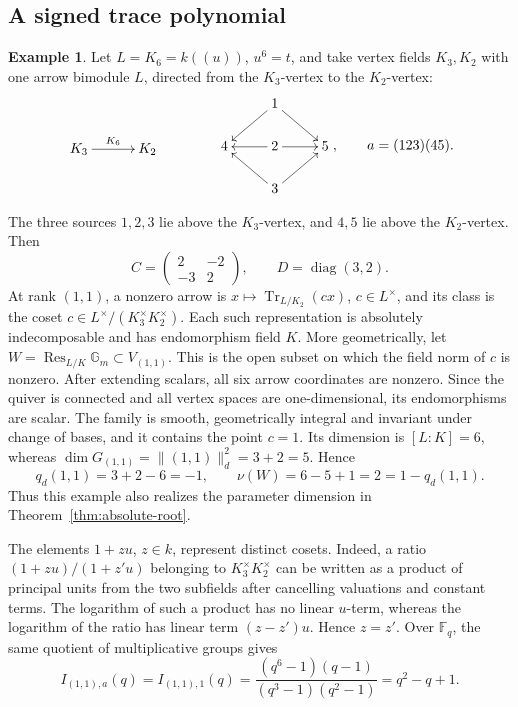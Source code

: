 \documentclass[11pt, reqno]{amsart}
\numberwithin{equation}{section}
\theoremstyle{definition}
\newtheorem{example}[theorem]{Example}
\theoremstyle{remark}
\newcommand{\op}[1]{\operatorname{#1}}
\newcommand{\mb}[1]{\mathbb{#1}}
\newcommand{\Tr}{\op{Tr}}
\newcommand{\Res}{\op{Res}}
\newcommand{\quiverdiagram}[1]{\vcenter{\hbox{$\displaystyle #1$}}}
\begin{document}
\subsection{A signed trace polynomial}\label{subsec:signed-example}
\begin{example}\label{ex:arithmeticfamily}
Let $L=K_6=k((u))$, $u^6=t$, and take vertex fields $K_3,K_2$
with one arrow bimodule $L$, directed from the $K_3$-vertex to the
$K_2$-vertex:
\begin{equation} \label{eq:3,2}
\quiverdiagram{\xymatrix@C=3em{K_3\ar[r]^{K_6}&K_2}}
\qquad\qquad
\quiverdiagram{\xymatrix@C=2.5em@R=1.8em{
 &1\ar[dl]\ar[dr]&\\
 4&2\ar[l]\ar[r]&5\\
 &3\ar[ul]\ar[ur]&
}},\qquad a=(123)(45).
\end{equation}

The three sources $1,2,3$ lie above the $K_3$-vertex, and $4,5$
lie above the $K_2$-vertex. Then
\[ C=\begin{pmatrix}2&-2\\-3&2\end{pmatrix},\qquad D=\op{diag}(3,2). \]
At rank $(1,1)$, a nonzero arrow is
$x\mapsto\Tr_{L/K_2}(cx)$, $c\in L^\times$, and its class is the coset
$c\in L^\times/(K_3^\times K_2^\times)$.
Each such representation is absolutely indecomposable and has
endomorphism field $K$. More geometrically, let
$W=\Res_{L/K}\mb G_m\subset V_{(1,1)}$. This is the open
subset on which the field norm of $c$ is nonzero. After extending
scalars, all six arrow coordinates are nonzero. Since the quiver is
connected and all vertex spaces are one-dimensional, its endomorphisms
are scalar. The family is smooth, geometrically integral and invariant
under change of bases, and it contains the point $c=1$. Its dimension is $[L:K]=6$,
whereas $\dim G_{(1,1)}=\lVert(1,1)\rVert_d^2=3+2=5$. Hence
\[ q_d(1,1)=3+2-6=-1,\qquad \nu(W)=6-5+1=2=1-q_d(1,1). \]
Thus this example also realizes the parameter dimension in
Theorem~\ref{thm:absolute-root}.

The elements $1+zu$, $z\in k$, represent distinct cosets. Indeed,
a ratio $(1+zu)/(1+z'u)$ belonging to $K_3^\times K_2^\times$
can be written as a product of principal units from the two subfields
after cancelling valuations and constant terms. The logarithm of such
a product has no linear $u$-term, whereas the logarithm of the ratio
has linear term $(z-z')u$. Hence $z=z'$. Over $\mb F_q$, the same quotient of multiplicative groups gives
\[ I_{(1,1),a}(q)=I_{(1,1),1}(q) =\frac{(q^6-1)(q-1)}{(q^3-1)(q^2-1)}=q^2-q+1. \]



\end{example}
\end{document}
